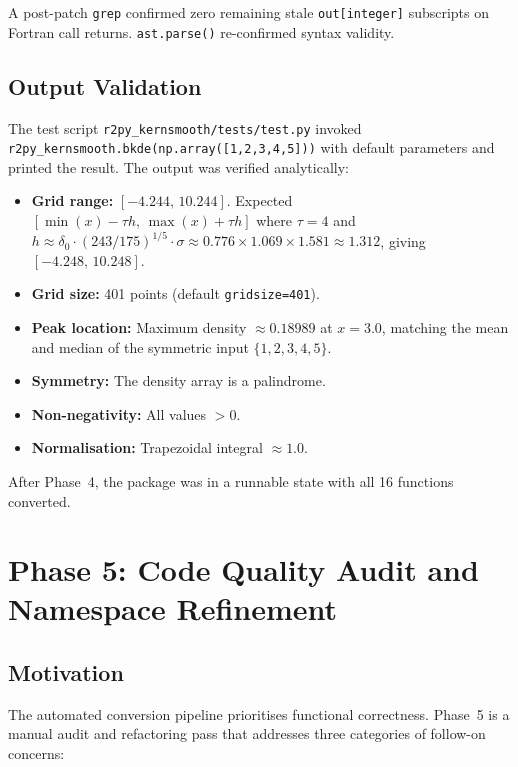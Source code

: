 \documentclass[12pt,a4paper]{article}
\begin{document}
A post-patch \texttt{grep} confirmed zero remaining stale \texttt{out[integer]} subscripts on Fortran call returns. \texttt{ast.parse()} re-confirmed syntax validity.

\subsection{Output Validation}

The test script \texttt{r2py\_kernsmooth/tests/test.py} invoked \texttt{r2py\_kernsmooth.bkde(np.array([1,2,3,4,5]))} with default parameters and printed the result. The output was verified analytically:

\begin{itemize}
  \item \textbf{Grid range:} $[-4.244,\,10.244]$. Expected $[\min(x)-\tau h,\,\max(x)+\tau h]$ where $\tau=4$ and $h \approx \delta_0 \cdot (243/175)^{1/5} \cdot \sigma \approx 0.776 \times 1.069 \times 1.581 \approx 1.312$, giving $[-4.248,\,10.248]$. \checkmark
  \item \textbf{Grid size:} 401 points (default \texttt{gridsize=401}).~\checkmark
  \item \textbf{Peak location:} Maximum density $\approx 0.18989$ at $x=3.0$, matching the mean and median of the symmetric input $\{1,2,3,4,5\}$.~\checkmark
  \item \textbf{Symmetry:} The density array is a palindrome.~\checkmark
  \item \textbf{Non-negativity:} All values $>0$.~\checkmark
  \item \textbf{Normalisation:} Trapezoidal integral $\approx 1.0$.~\checkmark
\end{itemize}

After Phase~4, the package was in a runnable state with all 16 functions converted.

\section{Phase 5: Code Quality Audit and Namespace Refinement}

\subsection{Motivation}

The automated conversion pipeline prioritises functional correctness. Phase~5 is a manual audit and refactoring pass that addresses three categories of follow-on concerns:
\end{document}
